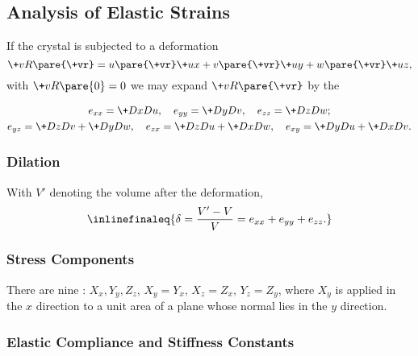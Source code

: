 \documentclass[hidelinks]{article}
\begin{document}


\subsection{Analysis of Elastic Strains} %
\label{sub:analysis_of_elastic_strains}

If the crystal is subjected to a deformation
\[ \+vR\pare{\+vr} = u\pare{\+vr}\+ux + v\pare{\+vr}\+uy + w\pare{\+vr}\+uz, \]
with $\+vR\pare{0} = 0$ we may expand $\+vR\pare{\+vr}$ by the 
\begin{finale}
\vspace{-\baselineskip}
    \begin{gather*}
        e_{xx} = \+DxDu,\quad e_{yy} = \+DyDv,\quad e_{zz} = \+DzDw; \\
        e_{yz} = \+DzDv + \+DyDw,\quad e_{zx} = \+DzDu + \+DxDw,\quad e_{xy} = \+DyDu + \+DxDv.
    \end{gather*}
\end{finale}

\subsubsection{Dilation} %
\label{ssub:dilation}

With $V'$ denoting the volume after the deformation,
\[ \inlinefinaleq{\delta = \frac{V' - V}{V} = e_{xx} + e_{yy} + e_{zz}.} \]


\subsubsection{Stress Components} %
\label{ssub:stress_components}

There are nine : $X_x, Y_y, Z_z$, $X_y = Y_x$, $X_z = Z_x$, $Y_z = Z_y$, where $X_y$ is applied in the $x$ direction to a unit area of a plane whose normal lies in the $y$ direction.


\subsubsection{Elastic Compliance and Stiffness Constants} %
\label{ssub:elastic_compliance_and_stiffness_constants}
\end{document}
